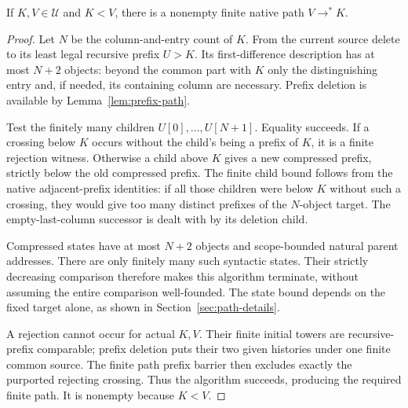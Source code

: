 \begin{lemma}\label{lem:reachability}
If $K,V\in\mathscr U$ and $K<V$, there is a nonempty finite native
path $V\to^*K$.
\end{lemma}
\begin{proof}
Let $N$ be the column-and-entry count of $K$. From the current
source delete to its least legal recursive prefix $U>K$. Its
first-difference description has at most $N+2$ objects: beyond
the common part with $K$ only the distinguishing entry and, if
needed, its containing column are necessary. Prefix deletion is
available by Lemma~\ref{lem:prefix-path}.

Test the finitely many children $U[0],\ldots,U[N+1]$. Equality
succeeds. If a crossing below $K$ occurs without the child's being
a prefix of $K$, it is a finite rejection witness. Otherwise a
child above $K$ gives a new compressed prefix, strictly below the
old compressed prefix. The finite child bound follows from the
native adjacent-prefix identities: if all those children were
below $K$ without such a crossing, they would give too many
distinct prefixes of the $N$-object target. The empty-last-column
successor is dealt with by its deletion child.

Compressed states have at most $N+2$ objects and scope-bounded
natural parent addresses. There are only finitely many such
syntactic states. Their strictly decreasing comparison therefore
makes this algorithm terminate, without assuming the entire
comparison well-founded. The state bound depends on the fixed target alone, as shown in
Section~\ref{sec:path-details}.

A rejection cannot occur for actual $K,V$. Their finite initial
towers are recursive-prefix comparable; prefix deletion puts their
two given histories under one finite common source. The finite
path prefix barrier then excludes exactly the purported rejecting
crossing. Thus the algorithm succeeds, producing the required
finite path. It is nonempty because $K<V$.
\end{proof}



